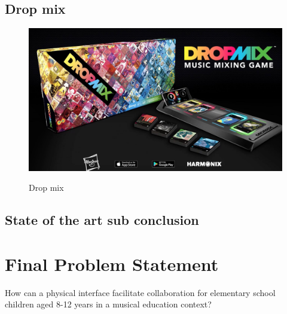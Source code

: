\subsection{Drop mix} 

\begin{figure}[H]
	\centering
	\includegraphics[width=0.7\linewidth]{figure/Analysis/dropmix}
	\label{fig:dropmix}
	\caption{Drop mix}
\end{figure}


	 
	\subsection{State of the art sub conclusion}


\section{Final Problem Statement}
	How can a physical interface facilitate collaboration for elementary school children aged 8-12 years in a musical education context?
	
















		